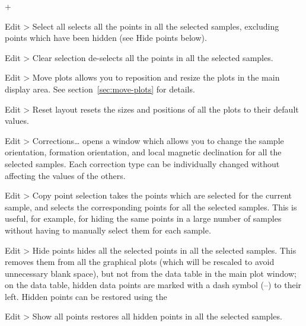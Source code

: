 \documentclass[a4paper,british]{article}
\newcommand{\menuitemlabel}[1]{%
\mbox{\textsf{#1}}\hfil}
\newenvironment{menuitemlist}%
{\begin{list}{}{%
\renewcommand{\makelabel}{\menuitemlabel}%
\setlength{\labelwidth}{35pt}%
\setlength{\leftmargin}%
             {\labelwidth+\labelsep}}}%
{\end{list}}
\newcommand{\ppcmd}[1]{\textsf{#1}} %
\newcommand{\submenu}{ \textgreater{} } %
\begin{document}
\begin{menuitemlist}

\item[Edit\submenu Select all] selects all the points in all the selected
samples, excluding points which have been hidden (see \ppcmd{Hide points}
below).

\item[Edit\submenu Clear selection] de-selects all the points in all
the selected samples.

\item[Edit\submenu Move plots] allows you to reposition and resize the plots
  in the main display area. See section~\ref{sec:move-plots} for
  details.

\item[Edit\submenu Reset layout] resets the sizes and positions of
all the plots to their default values.

\item[Edit\submenu Corrections\ldots] opens a window which allows you to
change the sample orientation, formation orientation, and local magnetic
declination for all the selected samples. Each correction type can be
individually changed without affecting the values of the others.

\item[Edit\submenu Copy point selection] takes the points which are
selected for the current sample, and selects the corresponding points
for all the selected samples. This is useful, for example, for hiding
the same points in a large number of samples without having to
manually select them for each sample.


\item[Edit\submenu Hide points] hides all the selected points in all the
selected samples. This removes them from all the graphical plots (which will
be rescaled to avoid unnecessary blank space), but not from the data table in
the main plot window; on the data table, hidden data points are marked with a
dash symbol (--) to their left. Hidden points can be restored using the

\item[Edit\submenu Show all points] restores all hidden points in all
the selected samples.




\end{menuitemlist}
\end{document}
